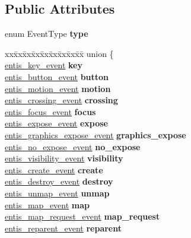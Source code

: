 \subsection*{Public Attributes}
\begin{DoxyCompactItemize}
\item 
\mbox{\label{structentis__event_aba10a3eaa7153c4dcf17e398ad01f0ae}} 
enum Event\+Type {\bfseries type}
\item 
\mbox{\label{structentis__event_a9ffe6b26ea904987bc30953503416975}} 
\begin{tabbing}
xx\=xx\=xx\=xx\=xx\=xx\=xx\=xx\=xx\=\kill
union \{\\
\>\hyperlink{structentis__key__event}{entis\_key\_event} {\bfseries key}\\
\>\hyperlink{structentis__button__event}{entis\_button\_event} {\bfseries button}\\
\>\hyperlink{structentis__motion__event}{entis\_motion\_event} {\bfseries motion}\\
\>\hyperlink{structentis__crossing__event}{entis\_crossing\_event} {\bfseries crossing}\\
\>\hyperlink{structentis__focus__event}{entis\_focus\_event} {\bfseries focus}\\
\>\hyperlink{structentis__expose__event}{entis\_expose\_event} {\bfseries expose}\\
\>\hyperlink{structentis__graphics__expose__event}{entis\_graphics\_expose\_event} {\bfseries graphics\_expose}\\
\>\hyperlink{structentis__no__expose__event}{entis\_no\_expose\_event} {\bfseries no\_expose}\\
\>\hyperlink{structentis__visibility__event}{entis\_visibility\_event} {\bfseries visibility}\\
\>\hyperlink{structentis__create__event}{entis\_create\_event} {\bfseries create}\\
\>\hyperlink{structentis__destroy__event}{entis\_destroy\_event} {\bfseries destroy}\\
\>\hyperlink{structentis__unmap__event}{entis\_unmap\_event} {\bfseries unmap}\\
\>\hyperlink{structentis__map__event}{entis\_map\_event} {\bfseries map}\\
\>\hyperlink{structentis__map__request__event}{entis\_map\_request\_event} {\bfseries map\_request}\\
\>\hyperlink{structentis__reparent__event}{entis\_reparent\_event} {\bfseries reparent}\\

\end{tabbing}
\end{DoxyCompactItemize}
